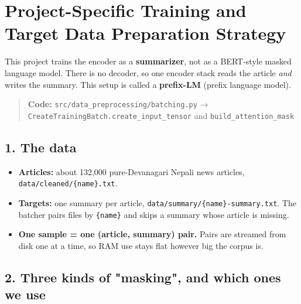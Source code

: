\documentclass[11pt,a4paper,oneside]{report}
\providecommand{\tightlist}{\setlength{\itemsep}{0pt}\setlength{\parskip}{0pt}}
\begin{document}
\section{Project-Specific Training and Target Data Preparation Strategy}\label{project-specific-training-and-target-data-preparation-strategy}

This project trains the encoder as a \textbf{summarizer}, not as a BERT-style masked language model. There is no decoder, so one encoder stack reads the article \emph{and} writes the summary. This setup is called a \textbf{prefix-LM} (prefix language model).

\begin{quote}
\textbf{Code:} \texttt{src/\allowbreak{}data\_\allowbreak{}preprocessing/\allowbreak{}batching.\allowbreak{}py} → \texttt{CreateTrainingBatch.\allowbreak{}create\_\allowbreak{}input\_\allowbreak{}tensor} and \texttt{build\_\allowbreak{}attention\_\allowbreak{}mask}
\end{quote}

\subsection{1. The data}\label{1-the-data}

\begin{itemize}
\tightlist
\item
  \textbf{Articles:} about 132,000 pure-Devanagari Nepali news articles, \texttt{data/cleaned/\{name\}.txt}.
\item
  \textbf{Targets:} one summary per article, \texttt{data/summary/\{name\}-summary.txt}. The batcher pairs files by \texttt{\{name\}} and skips a summary whose article is missing.
\item
  \textbf{One sample = one (article, summary) pair.} Pairs are streamed from disk one at a time, so RAM use stays flat however big the corpus is.
\end{itemize}

\subsection{2. Three kinds of "masking", and which ones we use}\label{2-three-kinds-of-masking-and-which-ones-we-use}
\end{document}
